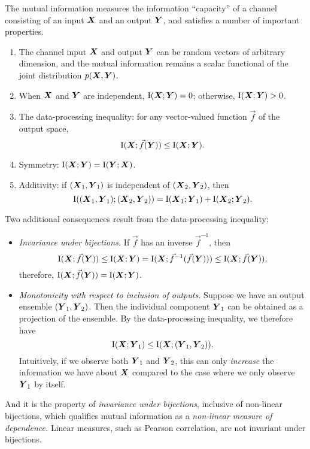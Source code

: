\documentclass[12pt]{article}
\begin{document}
The mutual information measures the information ``capacity'' of a
channel consisting of an input $\boldsymbol{X}$ and an output $\boldsymbol{Y}$, and
satisfies a number of important properties.
\begin{enumerate}
\item The channel input $\boldsymbol{X}$ and output $\boldsymbol{Y}$ can be random vectors of arbitrary dimension, and the mutual information remains a scalar functional of the joint distribution $p(\boldsymbol{X}, \boldsymbol{Y})$.
\item When $\boldsymbol{X}$ and $\boldsymbol{Y}$ are independent, $\text{I}(\boldsymbol{X}; \boldsymbol{Y}) = 0$; otherwise, $\text{I}(\boldsymbol{X}; \boldsymbol{Y}) > 0$.
\item The data-processing inequality: for any vector-valued function $\vec{f}$ of the output space,
\[
\text{I}(\boldsymbol{X}; \vec{f}(\boldsymbol{Y})) \leq \text{I}(\boldsymbol{X}; \boldsymbol{Y}).
\]
\item Symmetry: $\text{I}(\boldsymbol{X}; \boldsymbol{Y}) = \text{I}(\boldsymbol{Y}; \boldsymbol{X})$.
\item Additivity: if $(\boldsymbol{X}_1,\boldsymbol{Y}_1)$ is independent of $(\boldsymbol{X}_2, \boldsymbol{Y}_2)$, then
\[
\text{I}((\boldsymbol{X}_1,\boldsymbol{Y}_1); (\boldsymbol{X}_2, \boldsymbol{Y}_2)) = \text{I}(\boldsymbol{X}_1; \boldsymbol{Y}_1) + \text{I}(\boldsymbol{X}_2; \boldsymbol{Y}_2).
\]
\end{enumerate}
Two additional consequences result from the data-processing inequality:
\begin{itemize}
\item \emph{Invariance under bijections.} If $\vec{f}$ has an inverse $\vec{f}^{-1}$, then 
\[
\text{I}(\boldsymbol{X}; \vec{f}(\boldsymbol{Y})) \leq \text{I}(\boldsymbol{X}; \boldsymbol{Y}) = \text{I}(\boldsymbol{X}; \vec{f}^{-1}(\vec{f}(\boldsymbol{Y}))) \leq \text{I}(\boldsymbol{X}; \vec{f}(\boldsymbol{Y})),
\]
therefore, $\text{I}(\boldsymbol{X}; \vec{f}(\boldsymbol{Y})) = \text{I}(\boldsymbol{X}; \boldsymbol{Y})$.
\item \emph{Monotonicity with respect to inclusion of outputs.}  Suppose we have an output ensemble $(\boldsymbol{Y}_1,\boldsymbol{Y}_2)$.  Then the individual component $\boldsymbol{Y}_1$ can be obtained as a projection of the ensemble.  By the data-processing inequality, we therefore have
\[
\text{I}(\boldsymbol{X}; \boldsymbol{Y}_1) \leq \text{I}(\boldsymbol{X}; (\boldsymbol{Y}_1, \boldsymbol{Y}_2)).
\]
Intuitively, if we observe both $\boldsymbol{Y}_1$ and $\boldsymbol{Y}_2$, this can
only \emph{increase} the information we have about $\boldsymbol{X}$ compared to
the case where we only observe $\boldsymbol{Y}_1$ by itself.
\end{itemize}
And it is the property of \emph{invariance under bijections},
inclusive of non-linear bijections, which qualifies mutual information
as a \emph{non-linear measure of dependence.}  Linear measures, such
as Pearson correlation, are not invariant under bijections.  
\end{document}
